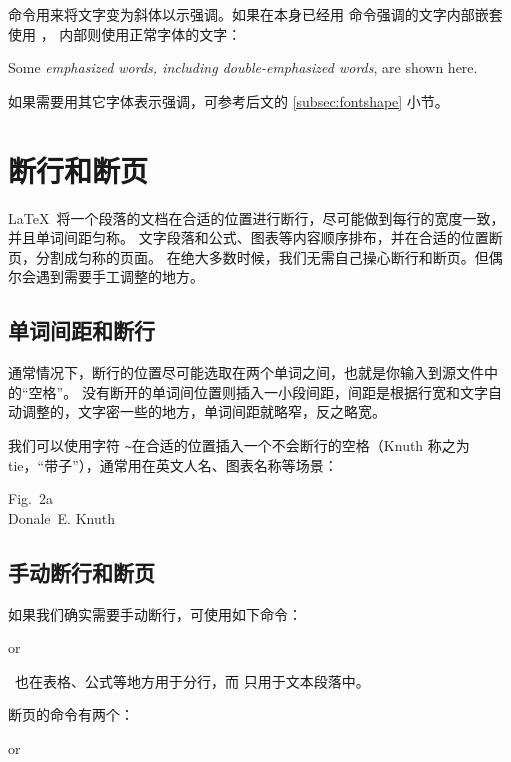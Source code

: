 {
 命令用来将文字变为斜体以示强调。如果在本身已经用  命令强调的文字内部嵌套使用 ，
内部则使用正常字体的文字：
\begin{example}
Some \emph{emphasized words, 
including \emph{double-emphasized}
words}, are shown here.
\end{example}

如果需要用其它字体表示强调，可参考后文的 \ref{subsec:fontshape} 小节。

\section{断行和断页}\label{sec:break}

\LaTeX\ 将一个段落的文档在合适的位置进行断行，尽可能做到每行的宽度一致，并且单词间距匀称。
文字段落和公式、图表等内容顺序排布，并在合适的位置断页，分割成匀称的页面。
在绝大多数时候，我们无需自己操心断行和断页。但偶尔会遇到需要手工调整的地方。

\subsection{单词间距和断行}\label{subsec:interword}

通常情况下，断行的位置尽可能选取在两个单词之间，也就是你输入到源文件中的“空格”。
没有断开的单词间位置则插入一小段间距，间距是根据行宽和文字自动调整的，文字密一些的地方，单词间距就略窄，反之略宽。

我们可以使用字符 \texttt\textasciitilde 在合适的位置插入一个不会断行的空格（Knuth 称之为 tie，“带子”），通常用在英文人名、图表名称等场景：
\begin{example}
Fig.~2a \\
Donale~E. Knuth
\end{example}

\subsection{手动断行和断页}\label{subsec:manual-break}

 
如果我们确实需要手动断行，可使用如下命令：
\begin{command}
\crcmd \quad or \quad {}
\end{command}

\crcmd\ 也在表格、公式等地方用于分行，而  只用于文本段落中。

断页的命令有两个：
\begin{command}
  \quad  or \quad {}
\end{command}

}
